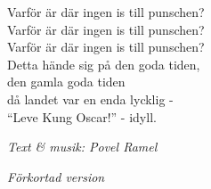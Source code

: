 \vspace{10pt}
Varför är där ingen is till punschen?\\
Varför är där ingen is till punschen?\\
Varför är där ingen is till punschen?\\
Detta hände sig på den goda tiden,\\
den gamla goda tiden\\
då landet var en enda lycklig -\\
``Leve Kung Oscar!'' - idyll.\par
\vspace{10pt}
{\footnotesize\textit{Text \& musik: Povel Ramel}}\par
\vspace{10pt}
{\footnotesize\textit{Förkortad version}}
